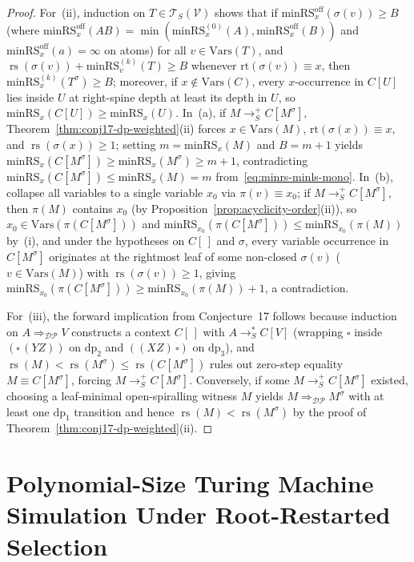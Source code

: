 \documentclass[11pt,reqno]{amsart}
\numberwithin{equation}{section}
\theoremstyle{plain}
\theoremstyle{definition}
\theoremstyle{remark}
\DeclareMathOperator{\rs}{rs}
\newcommand{\TSV}{\mathcal{T}_S(\mathcal{V})}
\newcommand{\redSp}{\to_S^+}
\newcommand{\redSs}{\to_S^*}
\begin{document}
\begin{proof}
For~(ii), induction on $T \in \TSV$ shows that if $\mathrm{minRS}_x^{\mathrm{off}}(\sigma(v)) \ge B$ (where $\mathrm{minRS}_x^{\mathrm{off}}(A B) = \min(\mathrm{minRS}_x^{(0)}(A), \mathrm{minRS}_x^{\mathrm{off}}(B))$ and $\mathrm{minRS}_x^{\mathrm{off}}(a) = \infty$ on atoms) for all $v \in \mathrm{Vars}(T)$, and $\rs(\sigma(v)) + \mathrm{minRS}_v^{(k)}(T) \ge B$ whenever $\mathrm{rt}(\sigma(v)) \equiv x$, then $\mathrm{minRS}_x^{(k)}(T^\sigma) \ge B$; moreover, if $x \notin \mathrm{Vars}(C)$, every $x$-occurrence in $C[U]$ lies inside $U$ at right-spine depth at least its depth in $U$, so $\mathrm{minRS}_x(C[U]) \ge \mathrm{minRS}_x(U)$. In~(a), if $M \redSp C[M^\sigma]$, Theorem~\ref{thm:conj17-dp-weighted}(ii) forces $x \in \mathrm{Vars}(M)$, $\mathrm{rt}(\sigma(x)) \equiv x$, and $\rs(\sigma(x)) \ge 1$; setting $m = \mathrm{minRS}_x(M)$ and $B = m + 1$ yields $\mathrm{minRS}_x(C[M^\sigma]) \ge \mathrm{minRS}_x(M^\sigma) \ge m + 1$, contradicting $\mathrm{minRS}_x(C[M^\sigma]) \le \mathrm{minRS}_x(M) = m$ from~\eqref{eq:minrs-minls-mono}. In~(b), collapse all variables to a single variable $x_0$ via $\pi(v) \equiv x_0$; if $M \redSp C[M^\sigma]$, then $\pi(M)$ contains $x_0$ (by Proposition~\ref{prop:acyclicity-order}(ii)), so $x_0 \in \mathrm{Vars}(\pi(C[M^\sigma]))$ and $\mathrm{minRS}_{x_0}(\pi(C[M^\sigma])) \le \mathrm{minRS}_{x_0}(\pi(M))$ by~(i), and under the hypotheses on $C[\,]$ and $\sigma$, every variable occurrence in $C[M^\sigma]$ originates at the rightmost leaf of some non-closed $\sigma(v)$ ($v \in \mathrm{Vars}(M)$) with $\rs(\sigma(v)) \ge 1$, giving $\mathrm{minRS}_{x_0}(\pi(C[M^\sigma])) \ge \mathrm{minRS}_{x_0}(\pi(M)) + 1$, a contradiction.

For~(iii), the forward implication from Conjecture~17 follows because induction on $A \Rightarrow_{\mathcal{DP}} V$ constructs a context $C[\,]$ with $A \redSs C[V]$ (wrapping $\square$ inside $(\square\,(Y Z))$ on $\mathrm{dp}_2$ and $((X Z)\,\square)$ on $\mathrm{dp}_3$), and $\rs(M) < \rs(M^\sigma) \le \rs(C[M^\sigma])$ rules out zero-step equality $M \equiv C[M^\sigma]$, forcing $M \redSp C[M^\sigma]$. Conversely, if some $M \redSp C[M^\sigma]$ existed, choosing a leaf-minimal open-spiralling witness $M$ yields $M \Rightarrow_{\mathcal{DP}} M^\sigma$ with at least one $\mathrm{dp}_1$ transition and hence $\rs(M) < \rs(M^\sigma)$ by the proof of Theorem~\ref{thm:conj17-dp-weighted}(ii).
\end{proof}

\section{Polynomial-Size Turing Machine Simulation Under Root-Restarted Selection}\label{sec:tm-sim}
\end{document}
